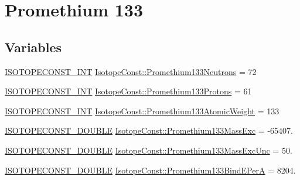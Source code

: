 \hypertarget{group___isotope_const-_promethium-_pm133}{}\section{Promethium 133}
\label{group___isotope_const-_promethium-_pm133}
\subsection*{Variables}
\begin{DoxyCompactItemize}
\item 
\mbox{\hyperlink{group___isotope_const-_macros_ga5f18360b3e99483a35c32d789e62621c}{I\+S\+O\+T\+O\+P\+E\+C\+O\+N\+S\+T\+\_\+\+I\+NT}} \mbox{\hyperlink{group___isotope_const-_promethium-_pm133_ga9bbad3ff51f2ca7984b7c64d29f126a8}{Isotope\+Const\+::\+Promethium133\+Neutrons}} = 72
\item 
\mbox{\hyperlink{group___isotope_const-_macros_ga5f18360b3e99483a35c32d789e62621c}{I\+S\+O\+T\+O\+P\+E\+C\+O\+N\+S\+T\+\_\+\+I\+NT}} \mbox{\hyperlink{group___isotope_const-_promethium-_pm133_gaf336096aca9bbeff1fc497a86f76d8c7}{Isotope\+Const\+::\+Promethium133\+Protons}} = 61
\item 
\mbox{\hyperlink{group___isotope_const-_macros_ga5f18360b3e99483a35c32d789e62621c}{I\+S\+O\+T\+O\+P\+E\+C\+O\+N\+S\+T\+\_\+\+I\+NT}} \mbox{\hyperlink{group___isotope_const-_promethium-_pm133_ga37edc989afca31fb82f6171d3d38c3bb}{Isotope\+Const\+::\+Promethium133\+Atomic\+Weight}} = 133
\item 
\mbox{\hyperlink{group___isotope_const-_macros_ga8f45a7272ce02c0b4c65c44636ed719a}{I\+S\+O\+T\+O\+P\+E\+C\+O\+N\+S\+T\+\_\+\+D\+O\+U\+B\+LE}} \mbox{\hyperlink{group___isotope_const-_promethium-_pm133_gae45da4b5dc218983ab1d4be84ca98029}{Isotope\+Const\+::\+Promethium133\+Mass\+Exc}} = -\/65407.
\item 
\mbox{\hyperlink{group___isotope_const-_macros_ga8f45a7272ce02c0b4c65c44636ed719a}{I\+S\+O\+T\+O\+P\+E\+C\+O\+N\+S\+T\+\_\+\+D\+O\+U\+B\+LE}} \mbox{\hyperlink{group___isotope_const-_promethium-_pm133_ga2dcb9eadf4ba74a02163d82fae075a34}{Isotope\+Const\+::\+Promethium133\+Mass\+Exc\+Unc}} = 50.
\item 
\mbox{\hyperlink{group___isotope_const-_macros_ga8f45a7272ce02c0b4c65c44636ed719a}{I\+S\+O\+T\+O\+P\+E\+C\+O\+N\+S\+T\+\_\+\+D\+O\+U\+B\+LE}} \mbox{\hyperlink{group___isotope_const-_promethium-_pm133_gaa871290632aa8cc7fdd1a954f3aa7a9d}{Isotope\+Const\+::\+Promethium133\+Bind\+E\+PerA}} = 8204.

\end{DoxyCompactItemize}
